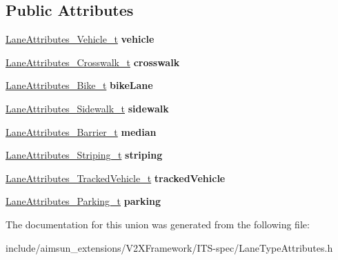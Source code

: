 \subsection*{Public Attributes}
\begin{DoxyCompactItemize}
\item 
\hyperlink{structBIT__STRING__s}{Lane\+Attributes\+\_\+\+Vehicle\+\_\+t} {\bfseries vehicle}\hypertarget{unionLaneTypeAttributes_1_1LaneTypeAttributes__u_ada35a00c41ea293723af1882d0c95b86}{}\label{unionLaneTypeAttributes_1_1LaneTypeAttributes__u_ada35a00c41ea293723af1882d0c95b86}

\item 
\hyperlink{structBIT__STRING__s}{Lane\+Attributes\+\_\+\+Crosswalk\+\_\+t} {\bfseries crosswalk}\hypertarget{unionLaneTypeAttributes_1_1LaneTypeAttributes__u_abec2be8e3b209502531d5d2aef6da93d}{}\label{unionLaneTypeAttributes_1_1LaneTypeAttributes__u_abec2be8e3b209502531d5d2aef6da93d}

\item 
\hyperlink{structBIT__STRING__s}{Lane\+Attributes\+\_\+\+Bike\+\_\+t} {\bfseries bike\+Lane}\hypertarget{unionLaneTypeAttributes_1_1LaneTypeAttributes__u_aebe5828f79f7424d79dd138eeb23c1ad}{}\label{unionLaneTypeAttributes_1_1LaneTypeAttributes__u_aebe5828f79f7424d79dd138eeb23c1ad}

\item 
\hyperlink{structBIT__STRING__s}{Lane\+Attributes\+\_\+\+Sidewalk\+\_\+t} {\bfseries sidewalk}\hypertarget{unionLaneTypeAttributes_1_1LaneTypeAttributes__u_a8374c4e130649c0d6a791e736131b2f0}{}\label{unionLaneTypeAttributes_1_1LaneTypeAttributes__u_a8374c4e130649c0d6a791e736131b2f0}

\item 
\hyperlink{structBIT__STRING__s}{Lane\+Attributes\+\_\+\+Barrier\+\_\+t} {\bfseries median}\hypertarget{unionLaneTypeAttributes_1_1LaneTypeAttributes__u_a33f393d68751d69f099d947b00b15945}{}\label{unionLaneTypeAttributes_1_1LaneTypeAttributes__u_a33f393d68751d69f099d947b00b15945}

\item 
\hyperlink{structBIT__STRING__s}{Lane\+Attributes\+\_\+\+Striping\+\_\+t} {\bfseries striping}\hypertarget{unionLaneTypeAttributes_1_1LaneTypeAttributes__u_a5ddd20fc44dcf44423bb299d1fdb6104}{}\label{unionLaneTypeAttributes_1_1LaneTypeAttributes__u_a5ddd20fc44dcf44423bb299d1fdb6104}

\item 
\hyperlink{structBIT__STRING__s}{Lane\+Attributes\+\_\+\+Tracked\+Vehicle\+\_\+t} {\bfseries tracked\+Vehicle}\hypertarget{unionLaneTypeAttributes_1_1LaneTypeAttributes__u_a44fb47e52146c17ba395203968a1b787}{}\label{unionLaneTypeAttributes_1_1LaneTypeAttributes__u_a44fb47e52146c17ba395203968a1b787}

\item 
\hyperlink{structBIT__STRING__s}{Lane\+Attributes\+\_\+\+Parking\+\_\+t} {\bfseries parking}\hypertarget{unionLaneTypeAttributes_1_1LaneTypeAttributes__u_a9e9f45c79c6d5ca37244eb382974082a}{}\label{unionLaneTypeAttributes_1_1LaneTypeAttributes__u_a9e9f45c79c6d5ca37244eb382974082a}

\end{DoxyCompactItemize}


The documentation for this union was generated from the following file\+:\begin{DoxyCompactItemize}
\item 
include/aimsun\+\_\+extensions/\+V2\+X\+Framework/\+I\+T\+S-\/spec/Lane\+Type\+Attributes.\+h\end{DoxyCompactItemize}
